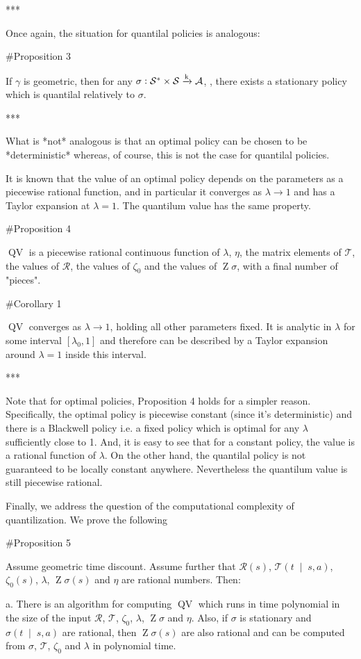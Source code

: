 \documentclass[a4paper]{article}
\newcommand{\AB}[1]{\left[#1\right]}
\newcommand{\APM}[2]{\left(#1\;\middle\vert\;#2\right)}
\newcommand{\K}{\xrightarrow{\textnormal{k}}}
\newcommand{\A}{\mathcal{A}}
\newcommand{\St}{\mathcal{S}}
\newcommand{\T}{\mathcal{T}}
\newcommand{\R}{\mathcal{R}}
\newcommand{\QV}{\operatorname{QV}}
\DeclareMathOperator{\Z}{Z}
\begin{document}
***

Once again, the situation for quantilal policies is analogous:

\#Proposition 3

If $\gamma$ is geometric, then for any $\sigma: \St^* \times \St \K \A$, , there exists a stationary policy which is quantilal relatively to $\sigma$.

***

What is *not* analogous is that an optimal policy can be chosen to be *deterministic* whereas, of course, this is not the case for quantilal policies.

It is known that the value of an optimal policy depends on the parameters as a piecewise rational function, and in particular it converges as $\lambda \rightarrow 1$ and has a Taylor expansion at $\lambda=1$. The quantilum value has the same property.

\#Proposition 4

$\QV$ is a piecewise rational continuous function of $\lambda$, $\eta$, the matrix elements of $\T$, the values of $\R$, the values of $\zeta_0$ and the values of $\Z\sigma$, with a final number of "pieces".

\#Corollary 1

$\QV$ converges as $\lambda \rightarrow 1$, holding all other parameters fixed. It is analytic in $\lambda$ for some interval $\AB{\lambda_0,1}$ and therefore can be described by a Taylor expansion around $\lambda=1$ inside this interval.

***

Note that for optimal policies, Proposition 4 holds for a simpler reason. Specifically, the optimal policy is piecewise constant (since it's deterministic) and there is a Blackwell policy i.e. a fixed policy which is optimal for any $\lambda$ sufficiently close to 1. And, it is easy to see that for a constant policy, the value is a rational function of $\lambda$. On the other hand, the quantilal policy is not guaranteed to be locally constant anywhere. Nevertheless the quantilum value is still piecewise rational.

Finally, we address the question of the computational complexity of quantilization. We prove the following

\#Proposition 5

Assume geometric time discount. Assume further that $\R(s)$, $\T\APM{t}{s,a}$, $\zeta_0(s)$, $\lambda$, $\Z{\sigma}(s)$ and $\eta$ are rational numbers. Then:

a. There is an algorithm for computing $\QV$ which runs in time polynomial in the size of the input $\R$, $\T$, $\zeta_0$, $\lambda$, $\Z\sigma$ and $\eta$. Also, if $\sigma$ is stationary and $\sigma\APM{t}{s,a}$ are rational, then $\Z{\sigma}(s)$ are also rational and can be computed from $\sigma$, $\T$, $\zeta_0$ and $\lambda$ in polynomial time.
\end{document}
